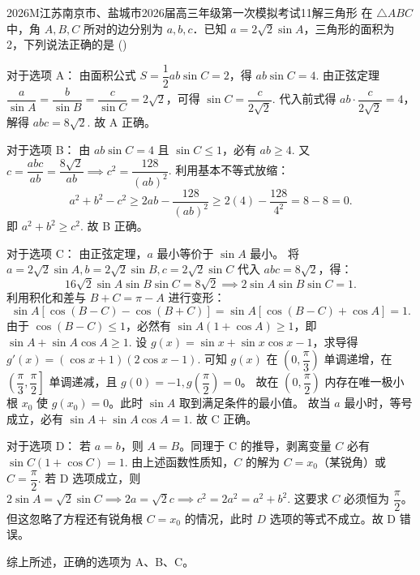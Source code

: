 
\begin{problem}{2026}{M}{江苏南京市、盐城市2026届高三年级第一次模拟考试}{11}{解三角形}
在 $\triangle ABC$ 中，角 $A,B,C$ 所对的边分别为 $a,b,c$．已知 $a=2\sqrt{2}\sin A$，三角形的面积为 2，下列说法正确的是
(\hspace{1cm})
\begin{choices}
\end{choices}

\begin{solution}
对于选项 A：
由面积公式 $S=\dfrac{1}{2}ab\sin C=2$，得 $ab\sin C=4$.
由正弦定理 $\dfrac{a}{\sin A}=\dfrac{b}{\sin B}=\dfrac{c}{\sin C}=2\sqrt{2}$，可得 $\sin C=\dfrac{c}{2\sqrt{2}}$.
代入前式得 $ab \cdot \dfrac{c}{2\sqrt{2}}=4$，解得 $abc=8\sqrt{2}$. 故 A 正确。

对于选项 B：
由 $ab\sin C=4$ 且 $\sin C \leqslant 1$，必有 $ab \geqslant 4$.
又 $c = \dfrac{abc}{ab} = \dfrac{8\sqrt{2}}{ab} \implies c^2 = \dfrac{128}{(ab)^2}$.
利用基本不等式放缩：
$$
a^2+b^2-c^2 \geqslant 2ab-\dfrac{128}{(ab)^2} \geqslant 2(4)-\dfrac{128}{4^2} = 8-8 = 0.
$$
即 $a^2+b^2 \geqslant c^2$. 故 B 正确。

对于选项 C：
由正弦定理，$a$ 最小等价于 $\sin A$ 最小。
将 $a=2\sqrt{2}\sin A, b=2\sqrt{2}\sin B, c=2\sqrt{2}\sin C$ 代入 $abc=8\sqrt{2}$，得：
$$
16\sqrt{2}\sin A\sin B\sin C=8\sqrt{2} \implies 2\sin A\sin B\sin C=1.
$$
利用积化和差与 $B+C=\pi-A$ 进行变形：
$$
\sin A[\cos(B-C)-\cos(B+C)] = \sin A[\cos(B-C)+\cos A] = 1.
$$
由于 $\cos(B-C) \leqslant 1$，必然有 $\sin A(1+\cos A) \geqslant 1$，即 $\sin A+\sin A\cos A \geqslant 1$.
设 $g(x)=\sin x+\sin x\cos x-1$，求导得 $g'(x)=(\cos x+1)(2\cos x-1)$.
可知 $g(x)$ 在 $\left(0,\dfrac{\pi}{3}\right)$ 单调递增，在 $\left(\dfrac{\pi}{3},\dfrac{\pi}{2}\right]$ 单调递减，且 $g(0)=-1, g\left(\dfrac{\pi}{2}\right)=0$。
故在 $\left(0,\dfrac{\pi}{2}\right)$ 内存在唯一极小根 $x_0$ 使 $g(x_0)=0$。此时 $\sin A$ 取到满足条件的最小值。
故当 $a$ 最小时，等号成立，必有 $\sin A+\sin A\cos A=1$. 故 C 正确。

对于选项 D：
若 $a=b$，则 $A=B$。同理于 C 的推导，剥离变量 $C$ 必有 $\sin C(1+\cos C)=1$.
由上述函数性质知，$C$ 的解为 $C=x_0$（某锐角）或 $C=\dfrac{\pi}{2}$.
若 D 选项成立，则 $2\sin A=\sqrt{2}\sin C \implies 2a=\sqrt{2}c \implies c^2=2a^2=a^2+b^2$.
这要求 $C$ 必须恒为 $\dfrac{\pi}{2}$。但这忽略了方程还有锐角根 $C=x_0$ 的情况，此时 $D$ 选项的等式不成立。故 D 错误。

综上所述，正确的选项为 A、B、C。
\end{solution}
\end{problem}
